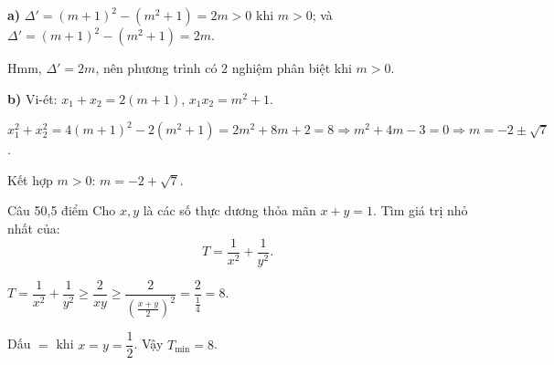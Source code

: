 \begin{loi_giai_cau}
\textbf{a)} $\Delta' = (m+1)^2-(m^2+1)=2m>0$ khi $m>0$; và $\Delta'=(m+1)^2-(m^2+1)=2m$.

Hmm, $\Delta'=2m$, nên phương trình có 2 nghiệm phân biệt khi $m>0$.

\textbf{b)} Vi-ét: $x_1+x_2=2(m+1)$, $x_1x_2=m^2+1$.

$x_1^2+x_2^2=4(m+1)^2-2(m^2+1)=2m^2+8m+2=8 \Rightarrow m^2+4m-3=0 \Rightarrow m=-2\pm\sqrt{7}$.

Kết hợp $m>0$: $m=\boxed{-2+\sqrt{7}}$.
\end{loi_giai_cau}

\begin{de_cau}{Câu 5}{0,5 điểm}
Cho $x, y$ là các số thực dương thỏa mãn $x + y = 1$. Tìm giá trị nhỏ nhất của:
\[T = \dfrac{1}{x^2} + \dfrac{1}{y^2}.\]
\end{de_cau}

\begin{loi_giai_cau}
$T=\dfrac{1}{x^2}+\dfrac{1}{y^2} \ge \dfrac{2}{xy} \ge \dfrac{2}{\left(\frac{x+y}{2}\right)^2} = \dfrac{2}{\frac{1}{4}} = 8$.

Dấu $=$ khi $x=y=\dfrac{1}{2}$. Vậy $T_{\min} = \boxed{8}$.
\end{loi_giai_cau}
